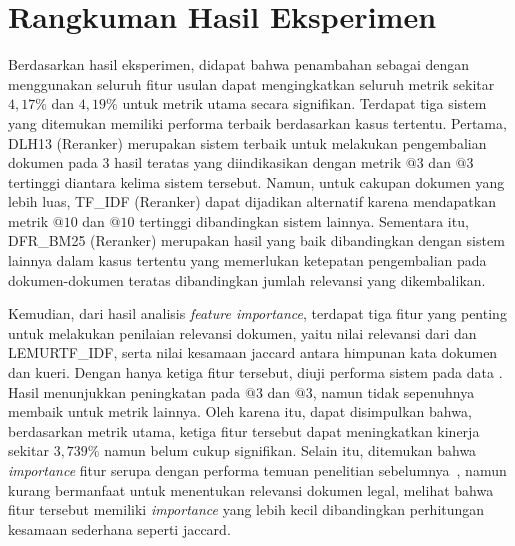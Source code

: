 \section{Rangkuman Hasil Eksperimen}
\label{subbab:5:Rangkuman Hasil Eksperimen}

Berdasarkan hasil eksperimen, didapat bahwa penambahan \lambdamart{} sebagai \reranker{} dengan menggunakan seluruh fitur usulan dapat mengingkatkan seluruh metrik sekitar $4,17\%$ dan $4,19\%$ untuk metrik utama secara signifikan. Terdapat tiga sistem yang ditemukan memiliki performa terbaik berdasarkan kasus tertentu. Pertama, DLH13 (Reranker) merupakan sistem terbaik untuk melakukan pengembalian dokumen pada 3 hasil teratas yang diindikasikan dengan metrik \recall{}$@3$ dan \precision{}$@3$ tertinggi diantara kelima sistem tersebut. Namun, untuk cakupan dokumen yang lebih luas, TF\_IDF (Reranker) dapat dijadikan alternatif karena mendapatkan metrik \recall{}$@10$ dan \precision{}$@10$ tertinggi dibandingkan sistem lainnya. Sementara itu, DFR\_BM25 (Reranker) merupakan hasil yang baik dibandingkan dengan sistem lainnya dalam kasus tertentu yang memerlukan ketepatan pengembalian pada dokumen-dokumen teratas dibandingkan jumlah relevansi yang dikembalikan.

Kemudian, dari hasil analisis \textit{feature importance}, terdapat tiga fitur yang penting untuk melakukan penilaian relevansi dokumen, yaitu nilai relevansi dari \obm{} dan LEMURTF\_IDF, serta nilai kesamaan jaccard antara himpunan kata dokumen dan kueri. Dengan hanya ketiga fitur tersebut, diuji performa sistem pada data \testing{}. Hasil menunjukkan peningkatan pada \recall{}$@3$ dan \precision{}$@3$, namun tidak sepenuhnya membaik untuk metrik lainnya. Oleh karena itu, dapat disimpulkan bahwa, berdasarkan metrik utama, ketiga fitur tersebut dapat meningkatkan kinerja sekitar $3,739\%$ namun belum cukup signifikan. Selain itu, ditemukan bahwa \textit{importance} fitur \encoder{} serupa dengan performa temuan penelitian sebelumnya~\citep{devlin2018bert, ni2021sentence}, namun kurang bermanfaat untuk menentukan relevansi dokumen legal, melihat bahwa fitur tersebut memiliki \textit{importance} yang lebih kecil dibandingkan perhitungan kesamaan sederhana seperti jaccard.

